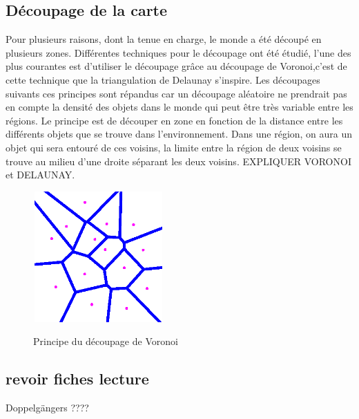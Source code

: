 	\subsection{Découpage de la carte}
	Pour plusieurs raisons, dont la tenue en charge, le monde a été découpé en plusieurs zones. Différentes techniques pour le découpage ont été étudié, l'une des plus courantes est d'utiliser le découpage grâce au découpage de Voronoi,c'est de cette technique que la triangulation de Delaunay s'inspire. Les découpages suivants ces principes sont répandus car un découpage aléatoire ne prendrait pas en compte la densité des objets dans le monde qui peut être très variable entre les régions. Le principe est de découper en zone en fonction de la distance entre les différents objets que se trouve dans l'environnement. Dans une région, on aura un objet qui sera entouré de ces voisins, la limite entre la région de deux voisins se trouve au milieu d'une droite séparant les deux voisins. EXPLIQUER VORONOI et DELAUNAY.\\
	\vspace{1cm}
        \begin{figure}[!h]
        \centering
        \includegraphics[width=5cm,height=5cm]{../Images/voronoi.png}\\
        \caption{Principe du découpage de Voronoi}
        \label{Voronoi}
        \end{figure}
        \vspace{1cm}
\newpage


	\subsection{revoir fiches lecture} 

	Doppelgängers ????
